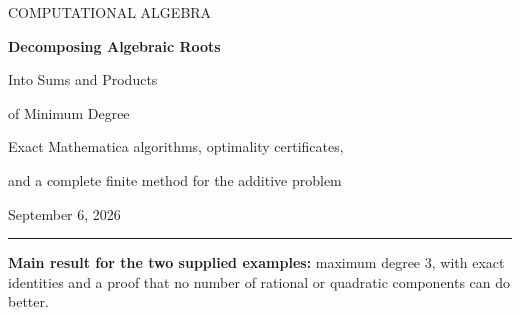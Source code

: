 \documentclass[11pt,a4paper]{article}
\theoremstyle{definition}
\theoremstyle{remark}
\begin{document}
\begin{titlepage}
\vspace*{12mm}
{\large\sffamily\color{linkblue}COMPUTATIONAL ALGEBRA\par}
\vspace{12mm}
{\Huge\bfseries\color{ink}Decomposing Algebraic Roots\par}
\vspace{5mm}
{\LARGE Into Sums and Products\par}
{\LARGE of Minimum Degree\par}
\vspace{10mm}
{\large Exact Mathematica algorithms, optimality certificates,\par
and a complete finite method for the additive problem\par}
\vspace{12mm}
{\large September 6, 2026\par}
\vspace{12mm}
\begin{abstract}
Given a specified algebraic number, how can one express it as a sum or a product of algebraic numbers while minimizing the largest absolute degree of a component? This is not ordinary polynomial factorization, and finding a plausible decomposition is not the same as proving its optimality. We develop exact resultant constructions, rational-coefficient discovery methods, finite exhaustive searches, root-selection certificates, and lower bounds that apply to arbitrarily many components. Both degree-nine examples in the motivating question have globally optimal maximum component degree three.

For sums, a normalized-trace argument gives a stronger general result: every decomposition can be replaced, without increasing any component degree, by one lying in the normal closure of the target field. Consequently, the unrestricted additive minimum is computable by a finite collection of rational fixed-space calculations. A reference implementation of this algorithm is supplied. For products, we explain precisely why the analogous norm argument does not give the same conclusion, and provide certified bounded searches without advertising them as an unrestricted terminating optimizer.

The accompanying archive contains Wolfram Language source, examples, regression specifications, and an independently executed SymPy verification script. The distinction between mathematical proofs, independently checked computations, and Wolfram code not executed in the authoring session is explicit.
\end{abstract}
\vfill
\rule{\textwidth}{.5pt}
\small
\textbf{Main result for the two supplied examples:} maximum degree $3$, with exact identities and a proof that no number of rational or quadratic components can do better.
\end{titlepage}
\end{document}
